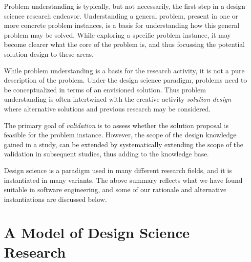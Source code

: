 \documentclass[graybox]{svmult}
\newcommand{\emelie}[1]{\textcolor{red}{{\it [Emelie says: #1]}}}
\newcommand{\emelie}[1]{}
\begin{document}
Problem understanding is typically, but not necessarily, the first step in a design science research endeavor. Understanding a general problem, present in one or more concrete problem instances, is a basis for understanding how this general problem may be solved.  While exploring a specific problem instance,   it may become clearer what the core of the problem is, and thus focussing the potential solution design to these areas. 

While problem understanding is a basis for the research activity, it is not a pure description of the problem. Under the design science paradigm, problems need to be conceptualized in terms of an envisioned solution. Thus problem understanding is often intertwined with the creative activity \emph{solution design} where alternative solutions and previous research may be considered. %


 The primary goal of \emph{validation} is to assess whether the solution proposal is feasible for the problem instance. However, the scope of the design knowledge gained in a study, can be extended by systematically extending the scope of the validation in subsequent studies, thus adding to the knowledge base. 



Design science is a paradigm used in many different research fields, and it is instantiated in many variants.  The above summary reflects what we have found suitable in software engineering, and some of our rationale and alternative instantiations are discussed below.



\section{A Model of Design Science Research}
\label{sec:DesignScienceResearch}
\end{document}
